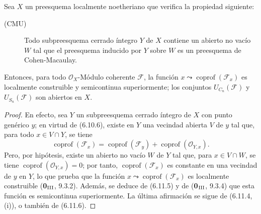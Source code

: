 \begin{proposition}[6.11.8]
\label{IV.2.s6.11.8-fr}
Sea $X$ un preesquema localmente noetheriano que verifica la propiedad siguiente:
\begin{description}
\item[\textmd{(CMU)}] Todo subpreesquema cerrado íntegro $Y$ de $X$ contiene un abierto
no vacío $W$ tal que el preesquema inducido por $Y$ sobre $W$ es un preesquema
de Cohen-Macaulay.
\end{description}
Entonces, para todo $\mathcal O_X$-Módulo coherente $\mathcal F$, la función
$x\leadsto\operatorname{coprof}(\mathcal F_x)$ es localmente construible
y semicontinua superiormente; los conjuntos $U_{C_n}(\mathcal F)$ y
$U_{S_n}(\mathcal F)$ son abiertos en $X$.
\end{proposition}

\begin{proof}
En efecto, sea $Y$ un subpreesquema cerrado íntegro de $X$ con punto
genérico $y$; en virtud de (6.10.6), existe en $Y$ una vecindad abierta
$V$ de $y$ tal que, para todo $x\in V\cap Y$, se tiene
\begin{equation}
\operatorname{coprof}(\mathcal F_x)=
\operatorname{coprof}(\mathcal F_y)+
\operatorname{coprof}(\mathcal O_{Y,x}).
\tag{6.11.8.1}\label{IV.2.s6.11.8.1-fr}
\end{equation}
Pero, por hipótesis, existe un abierto no vacío $W$ de $Y$ tal que, para
$x\in V\cap W$, se tiene $\operatorname{coprof}(\mathcal O_{Y,x})=0$; por tanto,
$\operatorname{coprof}(\mathcal F_x)$ es constante en una vecindad de
$y$ en $Y$, lo que prueba que la función
$x\leadsto\operatorname{coprof}(\mathcal F_x)$ es localmente construible
(\textbf{0}$_{\rm III}$, 9.3.2). Además, se deduce de (6.11.5) y de
(\textbf{0}$_{\rm III}$, 9.3.4) que esta función es semicontinua superiormente.
La última afirmación se sigue de (6.11.4, (i)), o también de (6.11.6).
\end{proof}

